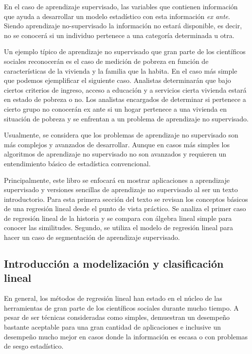 \documentclass[letterpaper,12pt, spanish, oneside]{book} %
\begin{document}
En el caso de aprendizaje supervisado, las variables que contienen información que ayuda a desarrollar un modelo estadístico con esta información \textit{ex ante}. Siendo aprendizaje no-supervisado la información no estará disponible, es decir, no se conocerá si un individuo pertenece a una categoría determinada u otra. 

Un ejemplo típico de aprendizaje no supervisado que gran parte de los científicos sociales reconocerán es el caso de medición de pobreza en función de características de la vivienda y la familia que la habita. En el caso más simple que podemos ejemplificar el siguiente caso. Analistas determinarán que bajo ciertos criterios de ingreso, acceso a educación y a servicios cierta vivienda estará en estado de pobreza o no. Los analistas encargados de determinar si pertenece a cierto grupo no conocerán ex ante si un hogar pertenece a una vivienda en situación de pobreza y se enfrentan a un problema de aprendizaje no supervisado.

Usualmente, se considera que los problemas de aprendizaje no supervisado son más complejos y avanzados de desarrollar. Aunque en casos más simples los algoritmos de aprendizaje no supervisado no son avanzados y requieren un entendimiento básico de estadística convencional.

Principalmente, este libro se enfocará en mostrar aplicaciones a aprendizaje supervisado y versiones sencillas de aprendizaje no supervisado al ser un texto introductorio. Para esta primera sección del texto se revisan los conceptos básicos de una regresión lineal desde el punto de vista práctico. Se analiza el primer caso de regresión lineal de la historia y se compara con álgebra lineal simple para conocer las similitudes. Segundo, se utiliza el modelo de regresión lineal para hacer un caso de segmentación de aprendizaje supervisado. 

\subsection{Introducción a modelización y clasificación lineal}

En general, los métodos de regresión lineal han estado en el núcleo de las herramientas de gran parte de los científicos sociales durante mucho tiempo. A pesar de ser técnicas consideradas como simples, demuestran un desempeño bastante aceptable para una gran cantidad de aplicaciones e inclusive un desempeño mucho mejor en casos donde la información es escasa o con problemas de sesgo estadístico.
\end{document}
